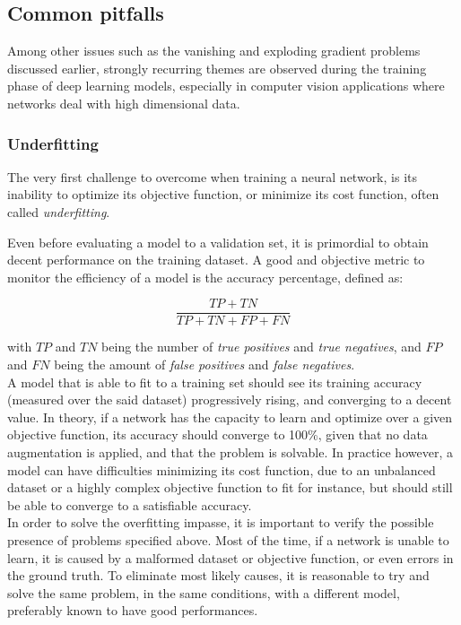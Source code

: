 \subsection{Common pitfalls}

Among other issues such as the vanishing and exploding gradient problems
discussed earlier, strongly recurring themes are observed during the training
phase of deep learning models, especially in computer vision applications where
networks deal with high dimensional data.

	\subsubsection{Underfitting}
The very first challenge to overcome when training a neural network, is its
inability to optimize its objective function, or minimize its cost function,
often called \emph{underfitting}.

Even before evaluating a model to a validation set, it is primordial to obtain
decent performance on the training dataset. A good and objective metric to
monitor the efficiency of a model is the accuracy percentage, defined as:

\begin{equation}
	\frac{TP+TN}{TP+TN+FP+FN}
\end{equation}

with $TP$ and $TN$ being the number of \emph{true positives} and \emph{true
negatives}, and $FP$ and $FN$ being the amount of \emph{false positives} and
\emph{false negatives}.\\

A model that is able to fit to a training set should see its training accuracy
(measured over the said dataset) progressively rising, and converging to a
decent value. In theory, if a network has the capacity to learn and optimize
over a given objective function, its accuracy should converge to 100\%, given
that no data augmentation is applied, and that the problem is solvable. In
practice however, a model can have difficulties minimizing its cost function,
due to an unbalanced dataset or a highly complex objective function to fit for
instance, but should still be able to converge to a satisfiable accuracy.\\

In order to solve the overfitting impasse, it is important to verify the
possible presence of problems specified above. Most of the time, if a network
is unable to learn, it is caused by a malformed dataset or objective function,
or even errors in the ground truth. To eliminate most likely causes, it is
reasonable to try and solve the same problem, in the same conditions, with a
different model, preferably known to have good performances.\\

